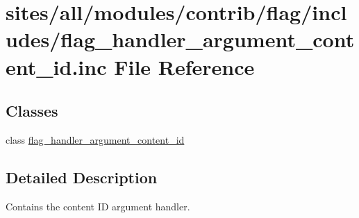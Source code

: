\hypertarget{flag__handler__argument__content__id_8inc}{
\section{sites/all/modules/contrib/flag/includes/flag\_\-handler\_\-argument\_\-content\_\-id.inc File Reference}
\label{flag__handler__argument__content__id_8inc}
}
\subsection*{Classes}
\begin{CompactItemize}
\item 
class \hyperlink{classflag__handler__argument__content__id}{flag\_\-handler\_\-argument\_\-content\_\-id}
\end{CompactItemize}


\subsection{Detailed Description}
Contains the content ID argument handler. 